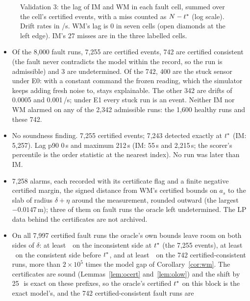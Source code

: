 \begin{figure}[t]
\centering

\caption{Validation 3: the lag of IM and WM in each fault cell, summed over the cell's certified events, with a miss
counted as $N-t^{\ast}$ (log scale). Drift rates in \degC/s. WM's lag is 0 in seven cells (open diamonds at the left
edge). IM's 27 misses are in the three labelled cells.}
\label{fig:cells}
\end{figure}

\begin{itemize}
\item Of the 8,000 fault runs, 7,255 are certified events, 742 are certified consistent (the fault never contradicts
  the model within the record, so the run is admissible) and 3 are undetermined. Of the 742, 400 are the stuck sensor
  under E0: with a constant command the frozen reading, which the simulator keeps adding fresh noise to, stays
  explainable. The other 342 are drifts of 0.0005 and 0.001\,\degC/s; under E1 every stuck run is an event. Neither IM nor WM alarmed on any of
  the 2,342 admissible runs: the 1,600 healthy runs and these 742.
\item No soundness finding. 7,255 certified events; 7,243 detected exactly at $t^{\ast}$ (IM: 5,257). Lag p90 0\,s and
  maximum 212\,s (IM: 55\,s and 2,215\,s; the scorer's percentile is the order statistic at the nearest index). No run
  was later than IM.
\item 7,258 alarms, each recorded with its certificate flag and a finite negative certified margin, the signed
  distance from WM's certified bounds on $a_s$ to the slab of radius $\delta+\eta$ around the measurement, rounded
  outward (the largest $-0.0147$\,m\degC); three of them on fault runs the oracle left undetermined. The LP data
  behind the certificates are not archived.
\item On all 7,997 certified fault runs the oracle's own bounds leave room on both sides of $\delta$: at least
  \,\degC\ on the inconsistent side at $t^{\ast}$ (the 7,255 events), at least \,\degC\ on
  the consistent side before $t^{\ast}$, and at least \,\degC\ on the 742 certified-consistent runs, more
  than $2\times10^5$ times the model gap of Corollary~\ref{cor:wm}. The certificates are sound
  (Lemmas~\ref{lem:ocert} and~\ref{lem:olow}) and the shift by 25\,\degC\ is exact on these prefixes, so the
  oracle's certified $t^{\ast}$ on this block is the exact model's, and the 742 certified-consistent fault runs are

\end{itemize}
